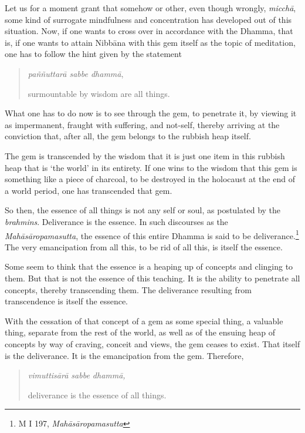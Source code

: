 Let us for a moment grant that somehow or other, even though wrongly, \emph{micchā}, some kind of surrogate mindfulness and concentration has developed out of this situation. Now, if one wants to cross over in accordance with the Dhamma, that is, if one wants to attain Nibbāna with this gem itself as the topic of meditation, one has to follow the hint given by the statement

\begin{quote}
\emph{paññuttarā sabbe dhammā},

surmountable by wisdom are all things.
\end{quote}

What one has to do now is to see through the gem, to penetrate it, by viewing it as impermanent, fraught with suffering, and not-self, thereby arriving at the conviction that, after all, the gem belongs to the rubbish heap itself.

The gem is transcended by the wisdom that it is just one item in this rubbish heap that is `the world' in its entirety. If one wins to the wisdom that this gem is something like a piece of charcoal, to be destroyed in the holocaust at the end of a world period, one has transcended that gem.

So then, the essence of all things is not any self or soul, as postulated by the \emph{brahmins}. Deliverance is the essence. In such discourses as the \emph{Mahāsāropamasutta}, the essence of this entire Dhamma is said to be deliverance.\footnote{M I 197, \emph{Mahāsāropamasutta}} The very emancipation from all this, to be rid of all this, is itself the essence.

Some seem to think that the essence is a heaping up of concepts and clinging to them. But that is not the essence of this teaching. It is the ability to penetrate all concepts, thereby transcending them. The deliverance resulting from transcendence is itself the essence.

With the cessation of that concept of a gem as some special thing, a valuable thing, separate from the rest of the world, as well as of the ensuing heap of concepts by way of craving, conceit and views, the gem ceases to exist. That itself is the deliverance. It is the emancipation from the gem. Therefore,

\begin{quote}
\emph{vimuttisārā sabbe dhammā,}

deliverance is the essence of all things.
\end{quote}

